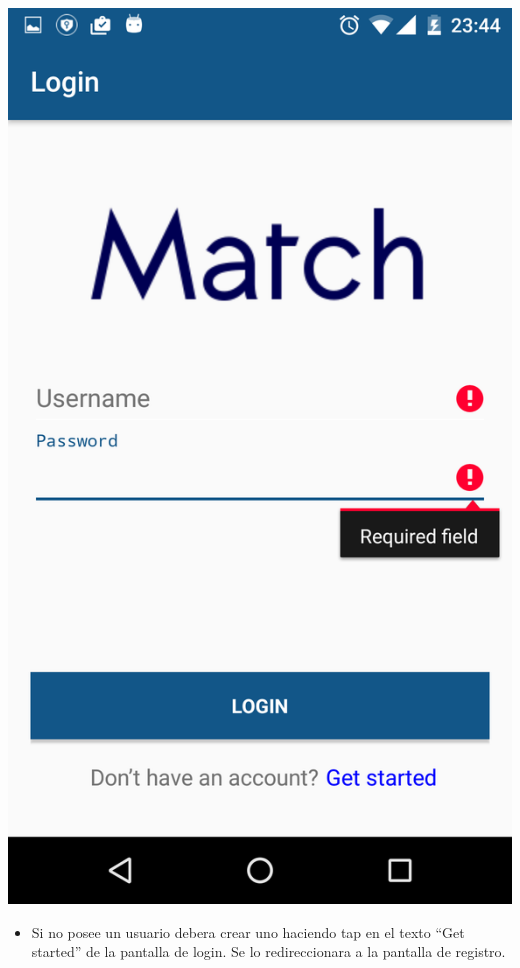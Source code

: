 \documentclass[letterpaper,10pt,english]{sphinxmanual}
\begin{document}
\includegraphics{login_failed.png}
\begin{itemize}
\item {} 
Si no posee un usuario debera crear uno haciendo tap en el texto “Get started” de la pantalla de login. Se lo redireccionara a la pantalla de registro.

\end{itemize}
\end{document}

